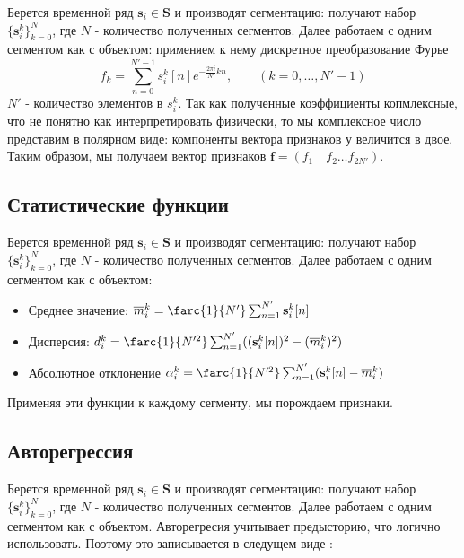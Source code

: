 \documentclass[12pt,twoside]{article}
\begin{document}
Берется временной ряд $\mathbf{s}_i \in \mathbf{S}$ и производят сегментацию: получают набор $\{\mathbf{s}^k_i\}^N_{k = 0}$, где $N$ -  количество полученных сегментов. Далее работаем с одним сегментом как с объектом: применяем к нему дискретное преобразование Фурье
\begin{equation}
f_k = \sum_{n=0}^{N'-1} s^k_i[n] e^{-\frac{2 \pi i}{N'} k n} %
, \qquad (k = 0, \dots, N'-1)
\end{equation}
$N'$ -  количество элементов в $s^k_i$. Так как полученные коэффициенты копмлексные, что не понятно как интерпретировать физически, то мы комплексное число представим в полярном виде: компоненты вектора признаков у величится в двое. Таким образом, мы получаем вектор признаков 
$\mathbf{f} = (f_1 \quad f_2 \dots f_{2N'})$.

\subsection{Статистические функции}
Берется временной ряд $\mathbf{s}_i \in \mathbf{S}$ и производят сегментацию: получают набор $\{\mathbf{s}^k_i\}^N_{k = 0}$, где $N$ -  количество полученных сегментов. Далее работаем с одним сегментом как с объектом:

\begin{itemize}
    \item Среднее значение: $\overline{m}^k_i= \farc{1}{N'}\sum^{N'}_{n = 1}\mathbf{s}^k_i[n] $
    
    \item Дисперсия: $d^k_i = \farc{1}{N'^2}\sum^{N'}_{n = 1}((\mathbf{s}^k_i[n])^2 - (\overline{m}^k_i)^2) $
    
    \item Абсолютное отклонение $\alpha^k_i = \farc{1}{N'^2}\sum^{N'}_{n = 1}(\mathbf{s}^k_i[n] - \overline{m}^k_i) $
\end{itemize}{}

Применяя эти функции к каждому сегменту, мы порождаем признаки.

\subsection{Авторегрессия}
Берется временной ряд $\mathbf{s}_i \in \mathbf{S}$ и производят сегментацию: получают набор $\{\mathbf{s}^k_i\}^N_{k = 0}$, где $N$ -  количество полученных сегментов. Далее работаем с одним сегментом как с объектом. Авторегресия учитывает предысторию, что логично использовать. Поэтому это записывается в следущем виде :
\end{document}
